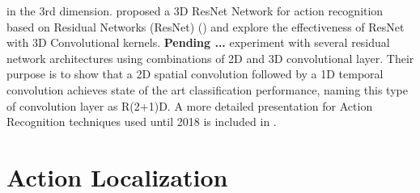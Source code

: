 in the 3rd dimension. \cite{DBLP:journals/corr/abs-1708-07632} proposed a 3D ResNet Network for action recognition based on Residual Networks (ResNet)
(\cite{DBLP:journals/corr/HeZRS15}) and explore the effectiveness of ResNet with 3D Convolutional kernels.
\cite{DBLP:journals/corr/abs-1711-08200} \textbf{Pending ...} \cite{DBLP:journals/corr/abs-1711-11248}
experiment with several residual network architectures using combinations of 2D and 3D convolutional layer. Their purpose is
to show that a 2D spatial convolution followed by a 1D temporal convolution achieves state of the art classification performance, naming
this type of convolution layer as R(2+1)D. A more detailed presentation for Action Recognition techniques used until 2018 is included in
\cite{DBLP:journals/corr/abs-1806-11230}.

\section{Action Localization}

